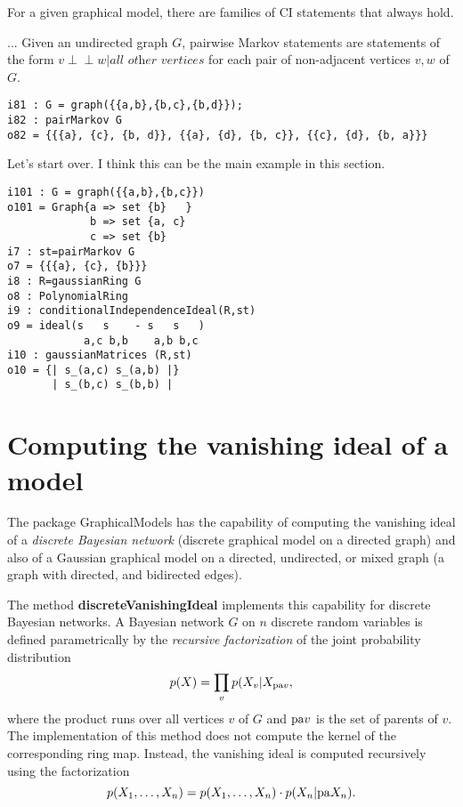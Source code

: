 \documentclass[letterpaper]{article}
\theoremstyle{definition}
\newcommand{\pa}{{\rm pa}}
\def\ci{\perp\!\!\!\perp}
\begin{document}
For a given graphical model, there are families of CI statements that always hold. 

...
Given an undirected graph $G$, pairwise Markov statements are statements of the form $v \ci w | \textit{all other vertices}$ for each pair of non-adjacent vertices $v, w$ of $G$. 
\begin{verbatim}
i81 : G = graph({{a,b},{b,c},{b,d}}); 
i82 : pairMarkov G
o82 = {{{a}, {c}, {b, d}}, {{a}, {d}, {b, c}}, {{c}, {d}, {b, a}}}
\end{verbatim}

Let's start over. I think this can be the main example in this section. 

\begin{verbatim}
i101 : G = graph({{a,b},{b,c}})
o101 = Graph{a => set {b}   }
             b => set {a, c}
             c => set {b}
i7 : st=pairMarkov G
o7 = {{{a}, {c}, {b}}}
i8 : R=gaussianRing G
o8 : PolynomialRing
i9 : conditionalIndependenceIdeal(R,st)
o9 = ideal(s   s    - s   s   )
            a,c b,b    a,b b,c
i10 : gaussianMatrices (R,st)
o10 = {| s_(a,c) s_(a,b) |}
       | s_(b,c) s_(b,b) |
\end{verbatim}


\section{Computing the vanishing ideal of a model}

The package GraphicalModels has the capability of computing the vanishing ideal
of  a \emph{discrete Bayesian network} (discrete graphical model on a directed
graph) and also of a Gaussian graphical model on a directed, undirected, or  mixed
graph (a graph with directed, and bidirected edges). 

The method
\textbf{discreteVanishingIdeal} implements this capability for discrete Bayesian
networks. A Bayesian network $G$ on $n$ discrete random variables 
is defined parametrically by the
\emph{recursive factorization} of the joint probability  distribution
\[p(X) = \prod_{v} p(X_{v} | X_{\pa v},\]
where the product runs over all vertices $v$ of $G$ and $\pa v$ is the set of
parents of $v$. 
The implementation of this method does not compute the kernel of the
corresponding ring map. Instead, the vanishing ideal is
computed recursively using the factorization 
\[p(X_{1},\dots, X_{n}) = p(X_{1},\dots, X_{n})\cdot p(X_{n} | \pa X_{n}).\]
\end{document}
